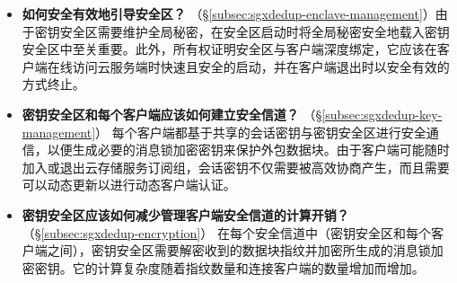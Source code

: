 \begin{itemize}
  \item \textbf{如何安全有效地引导安全区？} （\S\ref{subsec:sgxdedup-enclave-management}）由于密钥安全区需要维护全局秘密，在安全区启动时将全局秘密安全地载入密钥安全区中至关重要。此外，所有权证明安全区与客户端深度绑定，它应该在客户端在线访问云服务端时快速且安全的启动，并在客户端退出时以安全有效的方式终止。
  \item \textbf{密钥安全区和每个客户端应该如何建立安全信道？} （\S\ref{subsec:sgxdedup-key-management}）
  每个客户端都基于共享的会话密钥与密钥安全区进行安全通信，以便生成必要的消息锁加密密钥来保护外包数据块。由于客户端可能随时加入或退出云存储服务订阅组，会话密钥不仅需要被高效协商产生，而且需要可以动态更新以进行动态客户端认证。
  \item \textbf{密钥安全区应该如何减少管理客户端安全信道的计算开销？} （\S\ref{subsec:sgxdedup-encryption}）
  在每个安全信道中（密钥安全区和每个客户端之间），密钥安全区需要解密收到的数据块指纹并加密所生成的消息锁加密密钥。它的计算复杂度随着指纹数量和连接客户端的数量增加而增加。
\end{itemize}
